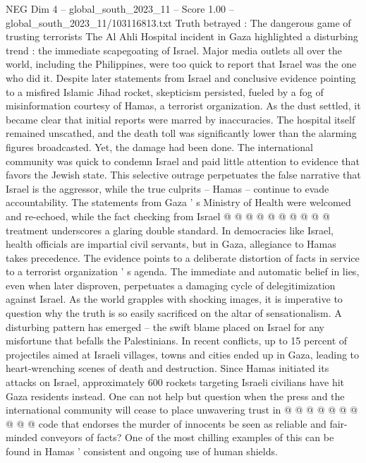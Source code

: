 \begin{textsample}{NEG Dim 4 – global\_south\_2023\_11 – Score 1.00 – global\_south\_2023\_11/103116813.txt}  \label{ex:f4_neg_304}
Truth betrayed : The dangerous game of trusting terrorists The Al Ahli Hospital incident in Gaza highlighted a disturbing trend : the immediate scapegoating of Israel.
Major media outlets all over the world, including the Philippines, were too quick to report that Israel was the one who did it.
Despite later statements from Israel and conclusive evidence pointing to a misfired Islamic Jihad rocket, skepticism persisted, fueled by a fog of misinformation courtesy of Hamas, a terrorist organization.
As the dust settled, it became clear that initial reports were marred by inaccuracies.
The hospital itself remained unscathed, and the death toll was significantly lower than the alarming figures broadcasted.
Yet, the damage had been done.
The international community was quick to condemn Israel and paid little attention to evidence that favors the Jewish state.
This selective outrage perpetuates the false narrative that Israel is the aggressor, while the true culprits -- Hamas -- continue to evade accountability.
The statements from Gaza ' s Ministry of Health were welcomed and re-echoed, while the fact checking from Israel @ @ @ @ @ @ @ @ @ @ treatment underscores a glaring double standard.
In democracies like Israel, health officials are impartial civil servants, but in Gaza, allegiance to Hamas takes precedence.
The evidence points to a deliberate distortion of facts in service to a terrorist organization ' s agenda.
The immediate and automatic belief in lies, even when later disproven, perpetuates a damaging cycle of delegitimization against Israel.
As the world grapples with shocking images, it is imperative to question why the truth is so easily sacrificed on the altar of sensationalism.
A disturbing pattern has emerged -- the swift blame placed on Israel for any misfortune that befalls the Palestinians.
In recent conflicts, up to 15 percent of projectiles aimed at Israeli villages, towns and cities ended up in Gaza, leading to heart-wrenching scenes of death and destruction.
Since Hamas initiated its attacks on Israel, approximately 600 rockets targeting Israeli civilians have hit Gaza residents instead.
One can not help but question when the press and the international community will cease to place unwavering trust in @ @ @ @ @ @ @ @ @ @ code that endorses the murder of innocents be seen as reliable and fair-minded conveyors of facts?
One of the most chilling examples of this can be found in Hamas ' consistent and ongoing use of human shields.

\end{textsample}
